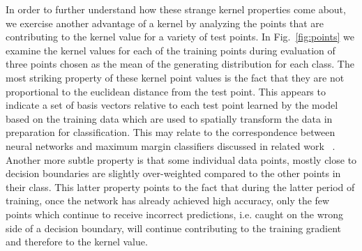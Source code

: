In order to further understand how these strange kernel properties come about, we exercise another advantage of a kernel by analyzing the points that are contributing to the kernel value for a variety of test points. 
In Fig.~\ref{fig:points} we examine the kernel values for each of the training points during evaluation of three points chosen as the mean of the generating distribution for each class. 
The most striking property of these kernel point values is the fact that they are not proportional to the euclidean distance from the test point.
This appears to indicate a set of basis vectors relative to each test point learned by the model based on the training data which are used to spatially transform the data in preparation for classification. This may relate to the correspondence between neural networks and maximum margin classifiers discussed in related work ~\citep{chizat2020maxmargin, shah2021input}. 
Another more subtle property is that some individual data points, mostly close to decision boundaries are slightly over-weighted compared to the other points in their class. 
This latter property points to the fact that during the latter period of training, once the network has already achieved high accuracy, only the few points which continue to receive incorrect predictions, i.e. caught on the wrong side of a decision boundary, will continue contributing to the training gradient and therefore to the kernel value.

